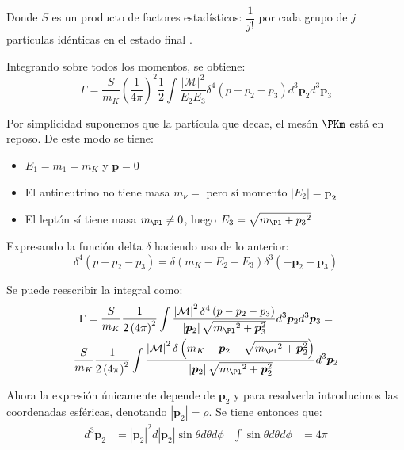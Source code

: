 Donde $S$ es un producto de factores estadísticos: $\dfrac{1}{j!}$ por cada grupo de $j$ partículas idénticas en el estado final \cite{Griffiths2008}.

Integrando sobre todos los momentos, se obtiene:
\begin{equation}
\Gamma =\dfrac{S}{m_{K}}\left( \dfrac{1}{4\pi }\right) ^{2}\dfrac{1}{2}\int \dfrac{\left| \mathcal{M}\right| ^{2}}{E_{2}E_{3}}\delta ^{4}\left( p-p_{2}-p_{3}\right) d^{3}\boldsymbol{p}_{2}d^{3}\boldsymbol{p}_{3}
\end{equation}

Por simplicidad suponemos que la partícula que decae, el mesón $\PKm$ está en reposo. De este modo se tiene:
\begin{itemize}
\item $E_1=m_1=m_K$ y $\boldsymbol{p}=0$
\item El antineutrino no tiene masa $m_{\nu}=$ pero sí momento $|E_2|=\boldsymbol{p_2}$
\item El leptón sí tiene masa $m_{\Pl} \neq 0$, luego $E_3=\sqrt{m_{\Pl}+{p_{3}}^2}$
\end{itemize}

Expresando la función delta $\delta$ haciendo uso de lo anterior:
\begin{equation}
\delta ^{4}\left( p-p_{2}-p_{3}\right) =\delta \left( m_{K}-E_{2}-E_{3}\right) \delta ^{3}\left( -\boldsymbol{p}_{2}-\boldsymbol{p}_{3}\right) 
\end{equation}

Se puede reescribir la integral como:
\begin{multline}
\Gamma =\dfrac{S}{m_{K}}\dfrac{1}{2\left( 4\pi \right) ^{2}}\int \dfrac{\left|\mathcal{M}\right| ^{2}\delta ^{4}\left( p-p_{2}-p_{3}\right) }{\left| \boldsymbol{p}_{2}\right| \sqrt{{m_{\Pl}}^{2}+\boldsymbol{p}_{3} ^{2}}} d^{3}\boldsymbol{p}_{2} d^{3}\boldsymbol{p}_{3} = \\ \dfrac{S}{m_{K}}\dfrac{1}{2\left( 4\pi \right) ^{2}}\int \dfrac{\left|\mathcal{M}\right| ^{2}\delta\left(m_{K}-\boldsymbol{p}_{2}-\sqrt{{m_{\Pl}}^{2}+\boldsymbol{p}_{2} ^{2}}\right)}{ \left| \boldsymbol{p}_{2}\right| \sqrt{{m_{\Pl}}^{2}+\boldsymbol{p}_{2} ^{2}}} d^{3}\boldsymbol{p}_{2}
\end{multline}

Ahora la expresión únicamente depende de $\boldsymbol{p}_{2}$ y para resolverla introducimos las coordenadas esféricas, denotando $\left| \boldsymbol{p}_{2}\right|=\rho$. Se tiene entonces que:
\begin{align}
d^{3}\boldsymbol{p}_{2} &= \left| \boldsymbol{p}_{2}\right| ^{2}d\left|\boldsymbol{p}_{2}\right| \sin \theta d\theta d\phi & \int \sin \theta d\theta d\phi &= 4\pi
\end{align}

